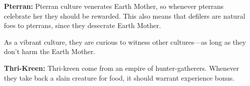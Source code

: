 \textbf{Pterran:} Pterran culture venerates Earth Mother, so whenever pterrans celebrate her they should be rewarded. This also means that defilers are natural foes to pterrans, since they desecrate Earth Mother.

As a vibrant culture, they are curious to witness other cultures---as long as they don't harm the Earth Mother.


\textbf{Thri-Kreen:} Thri-kreen come from an empire of hunter-gatherers. Whenever they take back a slain creature for food, it should warrant experience bonus.







